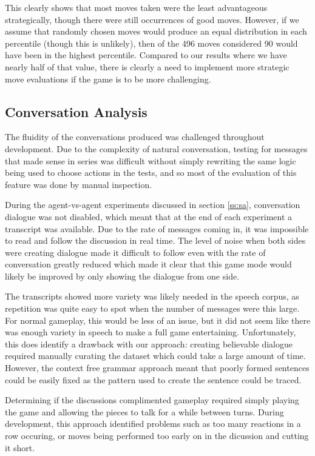 \documentclass{article}
\begin{document}
This clearly shows that most moves taken were the least advantageous strategically, though there were still occurrences of good moves. However, if we assume that randomly chosen moves would produce an equal distribution in each percentile (though this is unlikely), then of the 496 moves considered 90 would have been in the highest percentile. Compared to our results where we have nearly half of that value, there is clearly a need to implement more strategic move evaluations if the game is to be more challenging.

\subsection{Conversation Analysis}

The fluidity of the conversations produced was challenged throughout development. Due to the complexity of natural conversation, testing for messages that made sense in series was difficult without simply rewriting the same logic being used to choose actions in the tests, and so most of the evaluation of this feature was done by manual inspection.

During the agent-vs-agent experiments discussed in section \ref{ss:sa}, conversation dialogue was not disabled, which meant that at the end of each experiment a transcript was available. Due to the rate of messages coming in, it was impossible to read and follow the discussion in real time.  The level of noise when both sides were creating dialogue made it difficult to follow even with the rate of conversation greatly reduced which made it clear that this game mode would likely be improved by only showing the dialogue from one side.

The transcripts showed more variety was likely needed in the speech corpus, as repetition was quite easy to spot when the number of messages were this large. For normal gameplay, this would be less of an issue, but it did not seem like there was enough variety in speech to make a full game entertaining. Unfortunately, this does identify a drawback with our approach: creating believable dialogue required manually curating the dataset which could take a large amount of time. However, the context free grammar approach meant that poorly formed sentences could be easily fixed as the pattern used to create the sentence could be traced.

Determining if the discussions complimented gameplay required simply playing the game and allowing the pieces to talk for a while between turns. During development, this approach identified problems such as too many reactions in a row occuring, or moves being performed too early on in the dicussion and cutting it short.
\end{document}
